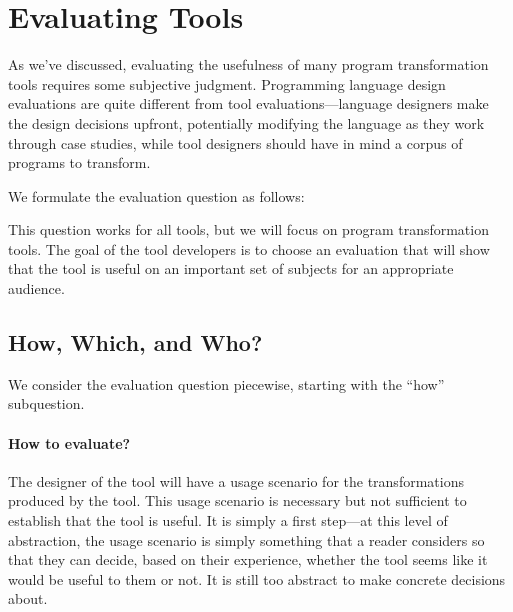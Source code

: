 \section{Evaluating Tools}
\label{sec:how-to-evaluate}
As we've discussed, evaluating the usefulness of many program
transformation tools requires some subjective judgment. 
Programming language design evaluations are
quite different from tool evaluations---language designers make
the design decisions upfront, potentially modifying the language
as they work through case studies, while tool designers should have
in mind a corpus of programs to transform.

We formulate the evaluation question as follows:
\begin{center}
\end{center}
This question works for all tools, but we will focus on program
transformation tools. The goal of the tool developers is to choose
an evaluation that will show that the tool is useful on an important
set of subjects for an appropriate audience.

\subsection{How, Which, and Who?}
We consider the evaluation question piecewise, starting with the ``how'' subquestion.

\paragraph{How to evaluate?} The designer of the tool will have a usage scenario for the
transformations produced by the tool. This usage scenario is necessary
but not sufficient to establish that the tool is useful. It is simply
a first step---at this level of abstraction, the usage scenario is
simply something that a reader considers so that they can decide,
based on their experience, whether the tool seems like it would be
useful to them or not.  It is still too abstract to make concrete
decisions about.

